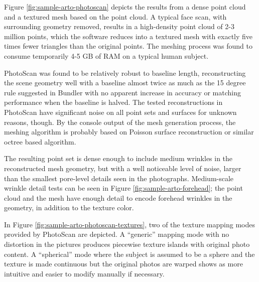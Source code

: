 Figure \ref{fig:sample-arto-photoscan} depicts the results from a dense point cloud and a textured mesh based on the point cloud.
A typical face scan, with surrounding geometry removed, results in a high-density point cloud of 2-3 million points, which the software reduces into a textured mesh with exactly five times fewer triangles than the original points.
The meshing process was found to consume temporarily 4-5 GB of RAM on a typical human subject.

PhotoScan was found to be relatively robust to baseline length, reconstructing the scene geometry well with a baseline almost twice as much as the 15 degree rule suggested in Bundler with no apparent increase in accuracy or matching performance when the baseline is halved.
The tested reconstructions in PhotoScan have significant noise on all point sets and surfaces for unknown reasons, though.
By the console output of the mesh generation process, the meshing algorithm is probably based on Poisson surface reconstruction or similar octree based algorithm.

The resulting point set is dense enough to include medium wrinkles in the reconstructed mesh geometry, but with a well noticeable level of noise, larger than the smallest pore-level details seen in the photographs.
Medium-scale wrinkle detail tests can be seen in Figure \ref{fig:sample-arto-forehead}; the point cloud and the mesh have enough detail to encode forehead wrinkles in the geometry, in addition to the texture color.

In Figure \ref{fig:sample-arto-photoscan-textures}, two of the texture mapping modes provided by PhotoScan are depicted.
A ``generic'' mapping mode with no distortion in the pictures produces piecewise texture islands with original photo content.
A ``spherical'' mode where the subject is assumed to be a sphere and the texture is made continuous but the original photos are warped shows as more intuitive and easier to modify manually if necessary.




